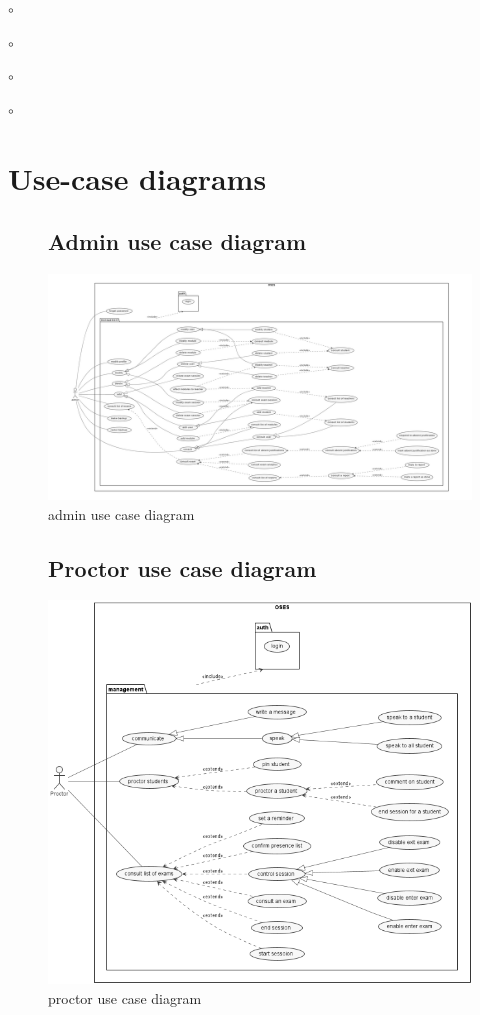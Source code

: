 \documentclass[]{uc2pfecaneva}
\begin{document}
\begin{list}{$\circ$}{}
\begin{list}{$\circ$}{}
\begin{list}{$\circ$}{}
\begin{list}{$\circ$}{}

    \raggedright\section{Use-case diagrams}
    \begin{figure}
        \subsection{Admin use case diagram}
        \centering
        \includegraphics[width=\textwidth]{images/admin_UCD}
        \caption{admin use case diagram}
    \end{figure}
    \clearpage

    \begin{figure}
        \subsection{Proctor use case diagram}
        \centering
        \includegraphics[width=\textwidth]{images/proctor_UCD}
        \caption{proctor use case diagram}
    \end{figure}



\end{list}
\end{list}
\end{list}
\end{list}
\end{document}
